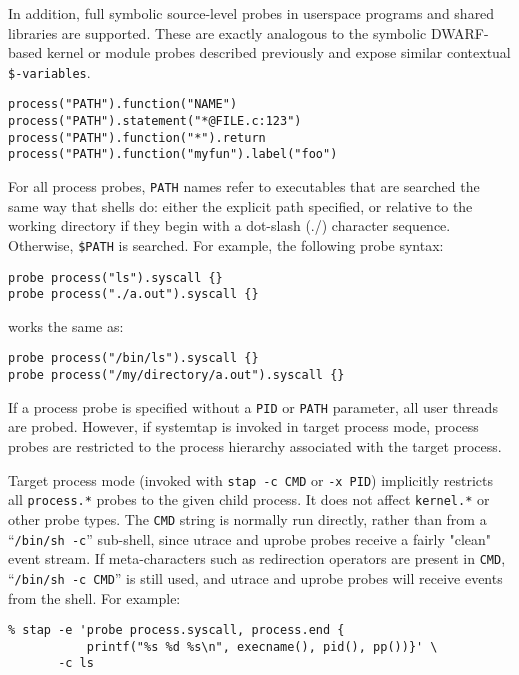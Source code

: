 \documentclass[twoside,english]{article}
\newenvironment{vindent}
{\begin{list}{}{\setlength{\listparindent}{6pt}}
\item[]}
{\end{list}}
\begin{document}
In addition, full symbolic source-level probes in userspace programs
and shared libraries are supported.  These are exactly analogous to
the symbolic DWARF-based kernel or module probes described previously
and expose similar contextual \texttt{\$-variables}.
\begin{vindent}
\begin{verbatim}
process("PATH").function("NAME")
process("PATH").statement("*@FILE.c:123")
process("PATH").function("*").return
process("PATH").function("myfun").label("foo")
\end{verbatim}
\end{vindent}

For all process probes, \texttt{PATH} names refer to executables that
are searched the same way that shells do: either the explicit path
specified, or relative to the working directory if they begin with a
dot-slash (./) character sequence. Otherwise, \texttt{\$PATH} is
searched.  For example, the following probe syntax:
\begin{vindent}
\begin{verbatim}
probe process("ls").syscall {}
probe process("./a.out").syscall {}
\end{verbatim}
\end{vindent}

works the same as:
\begin{vindent}
\begin{verbatim}
probe process("/bin/ls").syscall {}
probe process("/my/directory/a.out").syscall {}
\end{verbatim}
\end{vindent}

If a process probe is specified without a \texttt{PID} or
\texttt{PATH} parameter, all user threads are probed. However, if
systemtap is invoked in target process mode, process probes are
restricted to the process hierarchy associated with the target
process.

Target process mode (invoked with \texttt{stap -c CMD} or \texttt{-x
  PID}) implicitly restricts all \texttt{process.*} probes to the
given child process.  It does not affect \texttt{kernel.*} or other
probe types.  The \texttt{CMD} string is normally run directly, rather
than from a ``\texttt{/bin/sh -c}'' sub-shell, since utrace and uprobe
probes receive a fairly "clean" event stream.  If meta-characters such
as redirection operators are present in \texttt{CMD}, ``\texttt{/bin/sh
  -c CMD}'' is still used, and utrace and uprobe probes will receive
events from the shell. For example:
\begin{vindent}
\begin{verbatim}
% stap -e 'probe process.syscall, process.end {
           printf("%s %d %s\n", execname(), pid(), pp())}' \
       -c ls
\end{verbatim}
\end{vindent}
\end{document}
